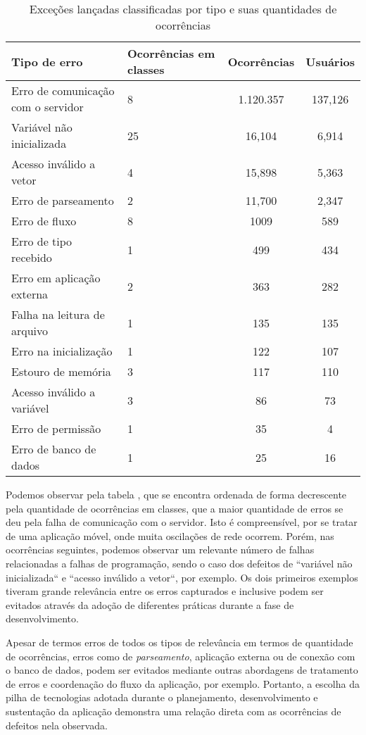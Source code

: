 \begin{table}[H]
    \centering
    \begin{tabularx}{\textwidth}{ l|X|c|c }
        \textbf{Tipo de erro} & \textbf{Ocorrências em classes} & \textbf{Ocorrências} & \textbf{Usuários} \\
        \hline
        Erro de comunicação com o servidor & 8 & 1.120.357 & 137,126 \\
        Variável não inicializada & 25 & 16,104 & 6,914 \\
        Acesso inválido a vetor & 4 & 15,898 & 5,363 \\
        Erro de parseamento & 2 & 11,700 & 2,347 \\
        Erro de fluxo & 8 & 1009 & 589 \\
        Erro de tipo recebido & 1 & 499 & 434 \\
        Erro em aplicação externa & 2 & 363 & 282 \\
        Falha na leitura de arquivo & 1 & 135 & 135 \\
        Erro na inicialização & 1 & 122 & 107 \\
        Estouro de memória & 3 & 117 & 110 \\
        Acesso inválido a variável & 3 & 86 & 73 \\
        Erro de permissão & 1 & 35 & 4 \\
        Erro de banco de dados & 1 & 25 & 16 \\
    \end{tabularx}
    \caption{Exceções lançadas classificadas por tipo e suas quantidades de ocorrências}
    \label{table:exceptions_classification}
\end{table}

Podemos observar pela tabela , que se encontra ordenada de forma decrescente pela quantidade de ocorrências em classes, que a maior quantidade de erros se deu pela falha de comunicação com o servidor. Isto é compreensível, por se tratar de uma aplicação móvel, onde muita oscilações de rede ocorrem. Porém, nas ocorrências seguintes, podemos observar um relevante número de falhas relacionadas a falhas de programação, sendo o caso dos defeitos de ``variável não inicializada`` e ``acesso inválido a vetor``, por exemplo. Os dois primeiros exemplos tiveram grande relevância entre os erros capturados e inclusive podem ser evitados através da adoção de diferentes práticas durante a fase de desenvolvimento.

Apesar de termos erros de todos os tipos de relevância em termos de quantidade de ocorrências, erros como de \textit{parseamento}, aplicação externa ou de conexão com o banco de dados, podem ser evitados mediante outras abordagens de tratamento de erros e coordenação do fluxo da aplicação, por exemplo. Portanto, a escolha da pilha de tecnologias adotada durante o planejamento, desenvolvimento e sustentação da aplicação demonstra uma relação direta com as ocorrências de defeitos nela observada.

